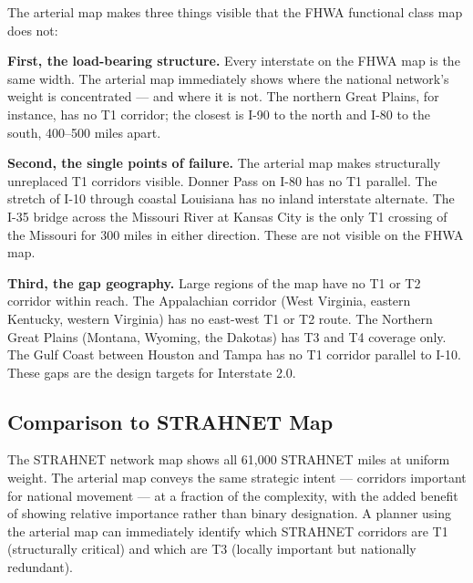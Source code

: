 The arterial map makes three things visible that the FHWA functional class map does not:

\textbf{First, the load-bearing structure.} Every interstate on the FHWA map is the same width. The arterial map immediately shows where the national network's weight is concentrated --- and where it is not. The northern Great Plains, for instance, has no T1 corridor; the closest is I-90 to the north and I-80 to the south, 400--500 miles apart.

\textbf{Second, the single points of failure.} The arterial map makes structurally unreplaced T1 corridors visible. Donner Pass on I-80 has no T1 parallel. The stretch of I-10 through coastal Louisiana has no inland interstate alternate. The I-35 bridge across the Missouri River at Kansas City is the only T1 crossing of the Missouri for 300 miles in either direction. These are not visible on the FHWA map.

\textbf{Third, the gap geography.} Large regions of the map have no T1 or T2 corridor within reach. The Appalachian corridor (West Virginia, eastern Kentucky, western Virginia) has no east-west T1 or T2 route. The Northern Great Plains (Montana, Wyoming, the Dakotas) has T3 and T4 coverage only. The Gulf Coast between Houston and Tampa has no T1 corridor parallel to I-10. These gaps are the design targets for Interstate 2.0.

\subsection{Comparison to STRAHNET Map}

The STRAHNET network map shows all 61,000 STRAHNET miles at uniform weight. The arterial map conveys the same strategic intent --- corridors important for national movement --- at a fraction of the complexity, with the added benefit of showing relative importance rather than binary designation. A planner using the arterial map can immediately identify which STRAHNET corridors are T1 (structurally critical) and which are T3 (locally important but nationally redundant).
